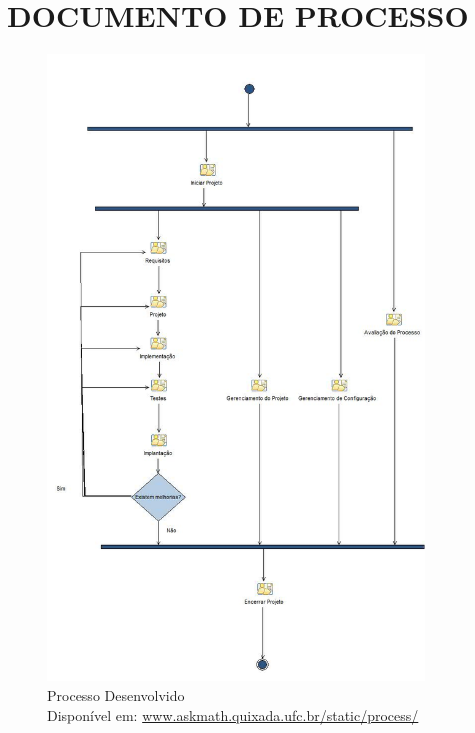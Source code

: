 \chapter{DOCUMENTO DE PROCESSO}\label{apendice_processo}

\begin{figure}[H]
\centering
\includegraphics[width=10cm]{figuras/figura_processo}
\caption[caption]{Processo Desenvolvido \\ Disponível em: \url{www.askmath.quixada.ufc.br/static/process/}}
\label{figura_processo}

\end{figure}